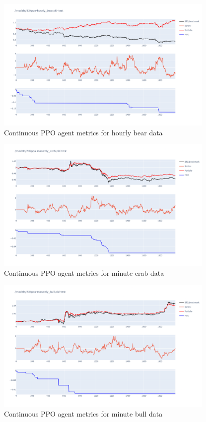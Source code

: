 \begin{figure}[H]
    \centering
    \includegraphics[width=0.94\textwidth]{graphics/testphoto/ppo-cont-hbr.png}
    \caption{Continuous PPO agent metrics for hourly bear data}
    \label{f-ppo-cont-hbr}
\end{figure}

\begin{figure}[H]
    \centering
    \includegraphics[width=0.94\textwidth]{graphics/testphoto/ppo-cont-mcr.png}
    \caption{Continuous PPO agent metrics for minute crab data}
    \label{f-ppo-cont-mcr}
\end{figure}

\begin{figure}[H]
    \centering
    \includegraphics[width=0.94\textwidth]{graphics/testphoto/ppo-cont-mbu.png}
    \caption{Continuous PPO agent metrics for minute bull data}
    \label{f-ppo-cont-mbu}
\end{figure}

